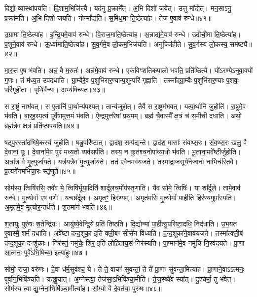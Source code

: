दिशो॒ व्यास्था॑पयति।
दि॒शाम॒भिजि॑त्त्यै।
यद॑नु प्र॒क्रामे᳚त्।
अ॒भि दिशो॑ जयेत्।
उत्तु मा᳚द्येत्।
मन॒साऽनु॒ प्रक्रा॑मति।
अ॒भि दिशो॑ जयति।
नोन्मा᳚द्यति।
स॒मिध॒मा ति॒ष्ठेत्या॑ह।
तेज॑ ए॒वाव॑ रुन्धे॥४१॥\ip

उ॒ग्रामा ति॒ष्ठेत्या॑ह।
इ॒न्द्रि॒यमे॒वाव॑ रुन्धे।
वि॒राज॒माति॒ष्ठेत्या॑ह।
अ॒न्नाद्य॑मे॒वाव॑ रुन्धे।
उदी॑ची॒मा ति॒ष्ठेत्या॑ह।
प॒शूने॒वाव॑ रुन्धे।
ऊ॒र्ध्वामाति॒ष्ठेत्या॑ह।
सु॒व॒र्गमे॒व लो॒कम॒भि\-ज॑यति।
अनूज्जि॑हीते।
सु॒व॒र्गस्य॑ लो॒कस्य॒ सम॑ष्ट्यै॥४२॥\ip

मा॒रु॒त ए॒ष भ॑वति।
अन्नं॒ वै म॒रुतः॑।
अन्न॑मे॒वाव॑ रुन्धे।
एक॑विꣳशतिकपालो भवति॒ प्रति॑\-ष्ठित्यै।
यो॑ऽरण्ये\-ऽनुवा॒क्यो॑ ग॒णः।
तं म॑ध्य॒त उप॑दधाति।
ग्रा॒म्यैरे॒व प॒शुभि॑रार॒ण्यान्प॒शू\-न्परि॑ गृह्णाति।
तस्मा᳚द्ग्रा॒म्यैः प॒शुभि॑रार॒ण्याः प॒शवः॒ परि॑गृहीताः।
पृथि॑र्वै॒न्यः।
अ॒भ्य॑षिच्यत॥४३॥\ip

स रा॒ष्ट्रं नाभ॑वत्।
स ए॒तानि॑ पा॒र्थान्य॑पश्यत्।
तान्य॑जुहोत्।
तैर्वै स रा॒ष्ट्रम॑भवत्।
यत्पा॒र्थानि॑ जु॒होति॑।
रा॒ष्ट्रमे॒व भ॑वति।
बा॒र्॒ह॒स्प॒त्यं पूर्वे॑षामुत्त॒मं भ॑वति।
ऐ॒न्द्रमुत्त॑रेषां प्रथ॒मम्।
ब्रह्म॑ चै॒वास्मै᳚ क्ष॒त्रं च॑ स॒मीची॑ दधाति।
अथो॒ ब्रह्म॑न्ने॒व क्ष॒त्रं प्रति॑\-ष्ठापयति॥४४॥\ip

षट्पु॒रस्ता॑दभिषे॒कस्य॑ जुहोति।
षडु॒परि॑ष्टात्।
द्वाद॑श॒ सम्प॑द्यन्ते।
द्वाद॑श॒ मासाः᳚ संवथ्स॒रः।
सं॒व॒थ्स॒रः खलु॒ वै दे॒वानां॒ पूः।
दे॒वाना॑मे॒व पुरं॑ मध्य॒तो व्यव॑सर्पति।
तस्य॒ न कुत॑श्च॒नोपा᳚व्या॒धो भ॑वति।
भू॒ताना॒मवे᳚ष्टीर्जुहोति।
अत्रा᳚त्र॒ वै मृ॒त्युर्जा॑यते।
यत्र॑यत्रै॒व मृ॒त्युर्जाय॑ते।
तत॑ ए॒वैन॒मव॑यजते।
तस्मा᳚द्राज॒सूये॑नेजा॒नो नाभिच॑रित॒वै।
प्र॒त्यगे॑नमभिचा॒रः स्तृ॑णुते॥४५॥\ip\anuvakamend[रु॒न्धे॒ सम॑ष्ट्या असिच्यत स्थापयति॒ जाय॑ते॒ पञ्च॑ च]

सोम॑स्य॒ त्विषि॑रसि॒ तवे॑व मे॒ त्विषि॑र्भूया॒दिति॑ शार्दूल\-च॒र्मोप॑स्तृणाति।
यैव सोमे॒ त्विषिः॑।
या शा᳚र्दू॒ले।
तामे॒वाव॑ रुन्धे।
मृ॒त्योर्वा ए॒ष वर्णः॑।
यच्छा᳚र्दू॒लः।
अ॒मृत॒ꣳ॒ हिर॑ण्यम्।
अ॒मृत॑मसि मृ॒त्योर्मा॑ पा॒हीति॒ हिर॑ण्य॒मुपा᳚स्यति।
अ॒मृत॑मे॒व मृ॒त्योर॒न्तर्ध॑त्ते।
श॒तमा॑नं भवति॥४६॥\ip

श॒तायुः॒ पुरु॑षः श॒तेन्द्रि॑यः।
आयु॑ष्ये॒वेन्द्रि॒ये प्रति॑ तिष्ठति।
दि॒द्योन्मा॑ पा॒हीत्यु॒परि॑ष्टा॒दधि॒ निद॑धाति।
उ॒भ॒यत॑ ए॒वास्मै॒ शर्म॑ दधाति।
अवे᳚ष्टा दन्द॒शूका॒ इति॑ क्ली॒बꣳ सीसे॑न विध्यति।
द॒न्द॒शूका॑ने॒वाव॑यजते।
तस्मा᳚त्क्ली॒बं द॑न्द॒शूका॒ दꣳशु॑काः।
निर॑स्तं॒ नमु॑चेः॒ शिर॒ इति॑ लोहिताय॒सं निर॑स्यति।
पा॒प्मान॑मे॒व नमु॑चिं नि॒रव॑दयते।
प्रा॒णा आ॒त्मनः॒ पूर्वे॑\-ऽभि॒षिच्या॒ इत्या॑हुः॥४७॥\ip

सोमो॒ राजा॒ वरु॑णः।
दे॒वा ध॑र्म॒सुव॑श्च॒ ये।
ते ते॒ वाचꣳ॑ सुवन्तां॒ ते ते᳚ प्रा॒णꣳ सु॑वन्ता॒मित्या॑ह।
प्रा॒णाने॒वा\-ऽऽत्मनः॒ पूर्वा॑न॒भिषि॑ञ्चति।
यद्ब्रू॒यात्।
अ॒ग्नेस्त्वा॒ तेज॑सा॒\-ऽभिषि॑ञ्चा॒मीति॑।
ते॒ज॒स्व्ये॑व स्या᳚त्।
दु॒श्चर्मा॒ तु भ॑वेत्।
सोम॑स्य त्वा द्यु॒म्नेना॒भिषि॑ञ्चा॒मीत्या॑ह।
सौ॒म्यो वै दे॒वत॑या॒ पुरु॑षः॥४८॥\ip

